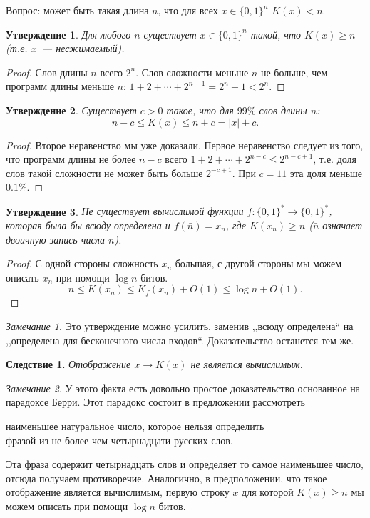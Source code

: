 \documentclass[12pt]{article}
\newcommand{\bits}{\{0,1\}}
\newcommand{\bitstr}{\bits^*}
\theoremstyle{definition}
\theoremstyle{plain}
\newtheorem{statement}{Утверждение}[section]
\newtheorem{corollary}{Следствие}[section]
\theoremstyle{remark}
\newtheorem{remark}{Замечание}[section]
\begin{document}
Вопрос: может быть такая длина $n$, что для всех $x\in\{0,1\}^n$ $K(x) < n$.
\begin{statement}
    Для любого $n$ существует $x\in\{0,1\}^n$ такой, что $K(x)\ge n$ (т.е.
    $x$~--- несжимаемый).
\end{statement}
\begin{proof}
    Слов длины $n$ всего $2^n$. Слов сложности меньше $n$ не больше, чем
    программ длины меньше $n$:
    \(
    1+2+\dotsb +2^{n-1} = 2^n - 1 < 2^n.
    \)
\end{proof}
\begin{statement}
    Существует $c > 0$ такое, что для $99\%$ слов длины $n$:
    \[
        n - c \le K(x) \le n + c = |x| + c.
    \]
\end{statement}
\begin{proof}
    Второе неравенство мы уже доказали. Первое неравенство следует из того, что
    программ длины не более $n - c$ всего $1+2+\dotsb +2^{n-c} \le 2^{n - c + 1}$,
    т.е. доля слов такой сложности не может быть больше $2^{-c + 1}$.
    При $c = 11$ эта доля меньше $0.1\%$. 
\end{proof}
\begin{statement}
    Не существует вычислимой функции $f:\bitstr\to\bitstr$, которая была бы
    всюду определена и $f(\bar n) = x_n$, где $K(x_n)\ge n$ ($\bar n$ означает
    двоичную запись числа $n$).
\end{statement}
\begin{proof} С одной стороны сложность $x_n$ большая, с другой стороны мы
    можем описать $x_n$ при помощи $\log n$ битов.
    \[
        n\le K(x_n)\le K_f(x_n) + O(1) \le \log n + O(1).
    \]
\end{proof}
\begin{remark}
    Это утверждение можно усилить, заменив ,,всюду определена`` на ,,определена
    для бесконечного числа входов``. Доказательство останется тем же.
\end{remark}
\begin{corollary}
    Отображение $x\to K(x)$ не является вычислимым.
\end{corollary}
\begin{remark}
    У этого факта есть довольно простое доказательство основанное на парадоксе Берри.
    Этот парадокс состоит в предложении рассмотреть 
    \begin{center}
        наименьшее натуральное число, которое нельзя определить\\ фразой
        из не более чем четырнадцати русских слов.
    \end{center}
    Эта фраза содержит четырнадцать слов и определяет то самое наименьшее число,
    отсюда получаем противоречие. Аналогично, в предположении, что такое отображение
    является вычислимым, первую строку $x$ для которой $K(x)\ge n$ мы можем описать
    при помощи $\log n$ битов.
\end{remark}
\end{document}
